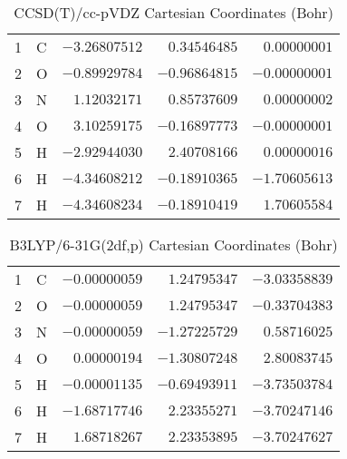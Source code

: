 \documentclass[10pt,oneside]{article}
\begin{document}
\begin{table}[h!]
\centering
\caption{CCSD(T)/cc-pVDZ Cartesian Coordinates (Bohr)}
\begin{tabular}{llrrr}
1  & C  & $-3.26807512$ & $ 0.34546485$ & $ 0.00000001$ \\
2  & O  & $-0.89929784$ & $-0.96864815$ & $-0.00000001$ \\
3  & N  & $ 1.12032171$ & $ 0.85737609$ & $ 0.00000002$ \\
4  & O  & $ 3.10259175$ & $-0.16897773$ & $-0.00000001$ \\
5  & H  & $-2.92944030$ & $ 2.40708166$ & $ 0.00000016$ \\
6  & H  & $-4.34608212$ & $-0.18910365$ & $-1.70605613$ \\
7  & H  & $-4.34608234$ & $-0.18910419$ & $ 1.70605584$ \\
\end{tabular}
\end{table}

\begin{table}[h!]
\centering
\caption{B3LYP/6-31G(2df,p) Cartesian Coordinates (Bohr)}
\begin{tabular}{llrrr}
1  & C  & $-0.00000059$ & $ 1.24795347$ & $-3.03358839$ \\
2  & O  & $-0.00000059$ & $ 1.24795347$ & $-0.33704383$ \\
3  & N  & $-0.00000059$ & $-1.27225729$ & $ 0.58716025$ \\
4  & O  & $ 0.00000194$ & $-1.30807248$ & $ 2.80083745$ \\
5  & H  & $-0.00001135$ & $-0.69493911$ & $-3.73503784$ \\
6  & H  & $-1.68717746$ & $ 2.23355271$ & $-3.70247146$ \\
7  & H  & $ 1.68718267$ & $ 2.23353895$ & $-3.70247627$ \\
\end{tabular}
\end{table}

\clearpage
\end{document}
